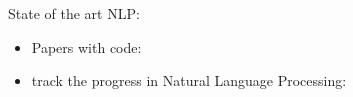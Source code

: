 \documentclass[11pt]{article}
\begin{document}
State of the art NLP:

\begin{itemize}
    \item Papers with code:~\cite{papers-with-code}
    \item  track the progress in Natural Language Processing:~\cite{track-progress-nlp}
\end{itemize}

\printbibliography
\end{document}
